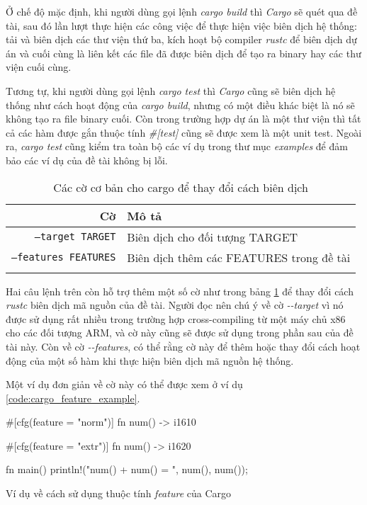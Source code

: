 Ở chế độ mặc định, khi người dùng gọi lệnh \emph{cargo build} thì \emph{Cargo} sẽ quét qua đề tài, sau đó lần lượt thực hiện các công việc để thực hiện việc biên dịch hệ thống: tải và biên dịch các thư viện thứ ba, kích hoạt bộ compiler \emph{rustc} để biên dịch dự án và cuối cùng là liên kết các file đã được biên dịch để tạo ra binary hay các thư viện cuối cùng.

Tương tự, khi người dùng gọi lệnh \emph{cargo test} thì \emph{Cargo} cũng sẽ biên dịch hệ thống như cách hoạt động của \emph{cargo build}, nhưng có một điều khác biệt là nó sẽ không tạo ra file binary cuối.
Còn trong trường hợp dự án là một thư viện thì tất cả các hàm được gắn thuộc tính \emph{\#[test]} cũng sẽ được xem là một unit test.
Ngoài ra, \emph{cargo test} cũng kiểm tra toàn bộ các ví dụ trong thư mục \emph{examples} để đảm bảo các ví dụ của đề tài không bị lỗi.

\begin{longtable}{r|l}
\textbf{Cờ} & \textbf{Mô tả} \\
\endhead
\midrule
\texttt{--target TARGET} & Biên dịch cho đối tượng TARGET \\
\texttt{--features FEATURES} & Biên dịch thêm các FEATURES trong đề tài \\
\bottomrule
\caption{Các cờ cơ bản cho cargo để thay đổi cách biên dịch}
\label{tbl:cargo_flags_example}
\end{longtable}

Hai câu lệnh trên còn hỗ trợ thêm một số cờ như trong bảng \ref{tbl:cargo_flags_example} để thay đổi cách \emph{rustc} biên dịch mã nguồn của đề tài.
Người đọc nên chú ý về cờ \emph{-{}-target} vì nó được sử dụng rất nhiều trong trường hợp cross-compiling từ một máy chủ x86 cho các đối tượng ARM, và cờ này cũng sẽ được sử dụng trong phần sau của đề tài này.
Còn về cờ \emph{-{}-features}, có thể rằng cờ này để thêm hoặc thay đổi cách hoạt động của một số hàm khi thực hiện biên dịch mã nguồn hệ thống.

Một ví dụ đơn giản về cờ này có thể được xem ở ví dụ \ref{code:cargo_feature_example}.

\begin{listing}
\begin{rustcode}
#[cfg(feature = "norm")]
fn num() -> i16{10}

#[cfg(feature = "extr")]
fn num() -> i16{20}

fn main() {
    println!("num() + num() = {} ", num(), num());
}
\end{rustcode}
\caption{Ví dụ về cách sử dụng thuộc tính \emph{feature} của Cargo}
\label{code:cargo_feature_example}
\end{listing}


